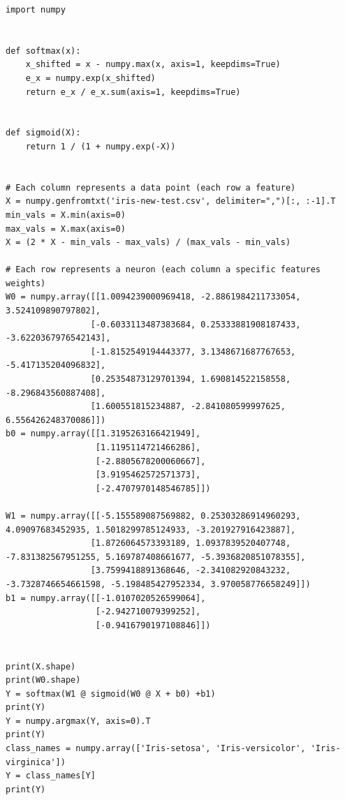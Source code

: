 \documentclass{article}
\begin{document}
\begin{verbatim}
import numpy


def softmax(x):
    x_shifted = x - numpy.max(x, axis=1, keepdims=True)
    e_x = numpy.exp(x_shifted)
    return e_x / e_x.sum(axis=1, keepdims=True)


def sigmoid(X):
    return 1 / (1 + numpy.exp(-X))


# Each column represents a data point (each row a feature)
X = numpy.genfromtxt('iris-new-test.csv', delimiter=",")[:, :-1].T
min_vals = X.min(axis=0)
max_vals = X.max(axis=0)
X = (2 * X - min_vals - max_vals) / (max_vals - min_vals)

# Each row represents a neuron (each column a specific features weights)
W0 = numpy.array([[1.0094239000969418, -2.8861984211733054, 3.524109890797802],
                 [-0.6033113487383684, 0.25333881908187433, -3.6220367976542143],
                 [-1.8152549194443377, 3.1348671687767653, -5.417135204096832],
                 [0.25354873129701394, 1.690814522158558, -8.296843560887408],
                 [1.600551815234887, -2.841080599997625, 6.556426248370086]])
b0 = numpy.array([[1.3195263166421949], 
                  [1.1195114721466286], 
                  [-2.8805678200060667], 
                  [3.9195462572571373], 
                  [-2.4707970148546785]])

W1 = numpy.array([[-5.155589087569882, 0.25303286914960293, 4.09097683452935, 1.5018299785124933, -3.201927916423887],
                 [1.8726064573393189, 1.0937839520407748, -7.831382567951255, 5.169787408661677, -5.3936820851078355],
                 [3.7599418891368646, -2.341082920843232, -3.7328746654661598, -5.198485427952334, 3.970058776658249]])
b1 = numpy.array([[-1.0107020526599064], 
                  [-2.942710079399252], 
                  [-0.9416790197108846]])


print(X.shape)
print(W0.shape)
Y = softmax(W1 @ sigmoid(W0 @ X + b0) +b1)
print(Y)
Y = numpy.argmax(Y, axis=0).T
print(Y)
class_names = numpy.array(['Iris-setosa', 'Iris-versicolor', 'Iris-virginica'])
Y = class_names[Y]
print(Y)
\end{verbatim}
\end{document}
